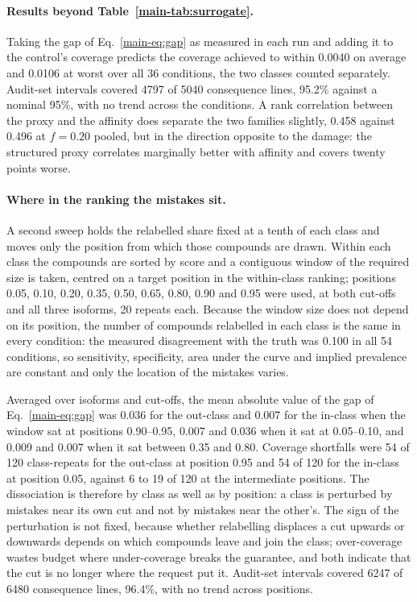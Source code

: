 \documentclass[10pt]{article}
\begin{document}
\paragraph{Results beyond Table~\ref{main-tab:surrogate}.} Taking the gap of Eq.~\ref{main-eq:gap} as measured in each run and adding it to the control's coverage predicts the coverage achieved to within 0.0040 on average and 0.0106 at worst over all 36 conditions, the two classes counted separately. Audit-set intervals covered 4797 of 5040 consequence lines, 95.2\% against a nominal 95\%, with no trend across the conditions. A rank correlation between the proxy and the affinity does separate the two families slightly, 0.458 against 0.496 at $f=0.20$ pooled, but in the direction opposite to the damage: the structured proxy correlates marginally better with affinity and covers twenty points worse.

\paragraph{Where in the ranking the mistakes sit.} A second sweep holds the relabelled share fixed at a tenth of each class and moves only the position from which those compounds are drawn. Within each class the compounds are sorted by score and a contiguous window of the required size is taken, centred on a target position in the within-class ranking; positions 0.05, 0.10, 0.20, 0.35, 0.50, 0.65, 0.80, 0.90 and 0.95 were used, at both cut-offs and all three isoforms, 20 repeats each. Because the window size does not depend on its position, the number of compounds relabelled in each class is the same in every condition: the measured disagreement with the truth was 0.100 in all 54 conditions, so sensitivity, specificity, area under the curve and implied prevalence are constant and only the location of the mistakes varies.

Averaged over isoforms and cut-offs, the mean absolute value of the gap of Eq.~\ref{main-eq:gap} was 0.036 for the out-class and 0.007 for the in-class when the window sat at positions 0.90--0.95, 0.007 and 0.036 when it sat at 0.05--0.10, and 0.009 and 0.007 when it sat between 0.35 and 0.80. Coverage shortfalls were 54 of 120 class-repeats for the out-class at position 0.95 and 54 of 120 for the in-class at position 0.05, against 6 to 19 of 120 at the intermediate positions. The dissociation is therefore by class as well as by position: a class is perturbed by mistakes near its own cut and not by mistakes near the other's. The sign of the perturbation is not fixed, because whether relabelling displaces a cut upwards or downwards depends on which compounds leave and join the class; over-coverage wastes budget where under-coverage breaks the guarantee, and both indicate that the cut is no longer where the request put it. Audit-set intervals covered 6247 of 6480 consequence lines, 96.4\%, with no trend across positions.
\end{document}
